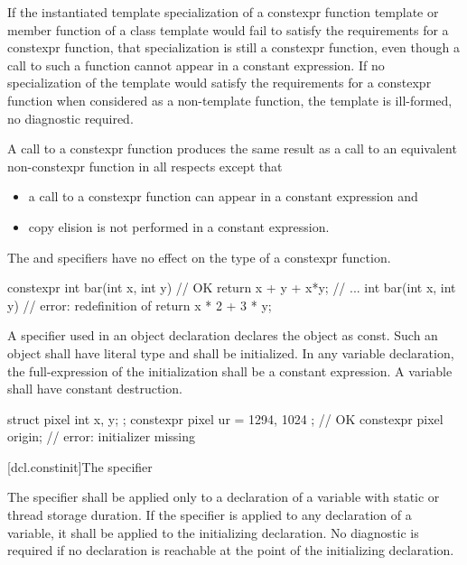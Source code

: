 \pnum
If the instantiated template specialization of a constexpr function
template
or member function of a class template
would fail to satisfy the requirements for a constexpr
function,
that specialization is still a constexpr function,
even though a call to such a function cannot appear in a constant
expression. If no specialization of the template would satisfy the
requirements for a constexpr function
when considered as a non-template function, the template is
ill-formed, no diagnostic required.

\pnum
A call to a constexpr function produces the same result as a call to an equivalent
non-constexpr function in all respects except that
\begin{itemize}
\item
a call to a constexpr
function can appear in a constant expression and
\item
copy elision is not performed in a constant expression.
\end{itemize}

\pnum
The  and  specifiers have no
effect on the type of a constexpr function.
\begin{example}
\begin{codeblock}
constexpr int bar(int x, int y)         // OK
    { return x + y + x*y; }
// ...
int bar(int x, int y)                   // error: redefinition of 
    { return x * 2 + 3 * y; }
\end{codeblock}
\end{example}

\pnum
A  specifier used in an object declaration
declares the object as const.
Such an object
shall have literal type and
shall be initialized.
In any  variable declaration,
the full-expression of the initialization
shall be a constant expression.
A  variable shall have constant destruction.
\begin{example}
\begin{codeblock}
struct pixel {
  int x, y;
};
constexpr pixel ur = { 1294, 1024 };    // OK
constexpr pixel origin;                 // error: initializer missing
\end{codeblock}
\end{example}

[dcl.constinit]{The  specifier}

\pnum
The  specifier shall be applied only
to a declaration of a variable with static or thread storage duration.
If the specifier is applied to any declaration of a variable,
it shall be applied to the initializing declaration.
No diagnostic is required if no  declaration
is reachable at the point of the initializing declaration.

